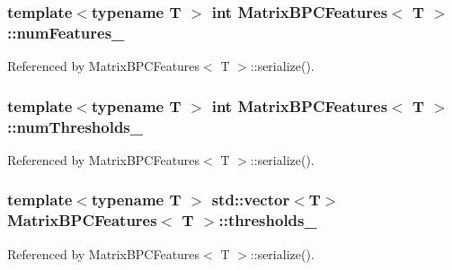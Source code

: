 \subsubsection[{\texorpdfstring{num\+Features\+\_\+}{numFeatures_}}]{\setlength{\rightskip}{0pt plus 5cm}template$<$typename T $>$ int {\bf Matrix\+B\+P\+C\+Features}$<$ T $>$\+::num\+Features\+\_\+}\hypertarget{classMatrixBPCFeatures_ad3a5bf17a1666bbecf520f68d109b460}{}\label{classMatrixBPCFeatures_ad3a5bf17a1666bbecf520f68d109b460}


Referenced by Matrix\+B\+P\+C\+Features$<$ T $>$\+::serialize().

\subsubsection[{\texorpdfstring{num\+Thresholds\+\_\+}{numThresholds_}}]{\setlength{\rightskip}{0pt plus 5cm}template$<$typename T $>$ int {\bf Matrix\+B\+P\+C\+Features}$<$ T $>$\+::num\+Thresholds\+\_\+}\hypertarget{classMatrixBPCFeatures_adcdf00f112691ab61c3d305a3a9cbe89}{}\label{classMatrixBPCFeatures_adcdf00f112691ab61c3d305a3a9cbe89}


Referenced by Matrix\+B\+P\+C\+Features$<$ T $>$\+::serialize().

\subsubsection[{\texorpdfstring{thresholds\+\_\+}{thresholds_}}]{\setlength{\rightskip}{0pt plus 5cm}template$<$typename T $>$ std\+::vector$<$T$>$ {\bf Matrix\+B\+P\+C\+Features}$<$ T $>$\+::thresholds\+\_\+}\hypertarget{classMatrixBPCFeatures_a34418b525a7ceb5b2ec203415c46f066}{}\label{classMatrixBPCFeatures_a34418b525a7ceb5b2ec203415c46f066}


Referenced by Matrix\+B\+P\+C\+Features$<$ T $>$\+::serialize().

